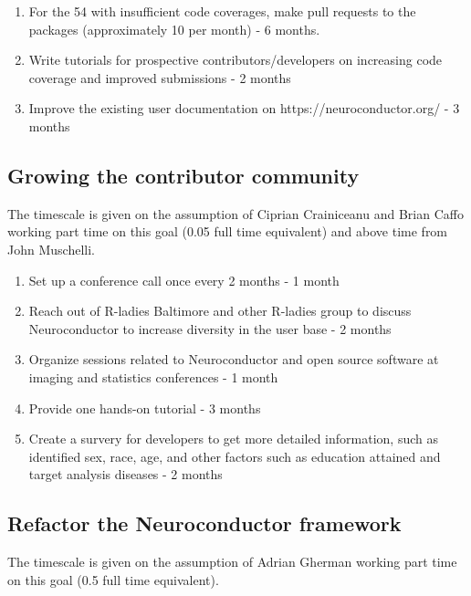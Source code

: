\documentclass[]{elsarticle} %
\providecommand{\tightlist}{%
  \setlength{\itemsep}{0pt}\setlength{\parskip}{0pt}}
\begin{document}
\begin{enumerate}
\def\labelenumi{\arabic{enumi}.}
\tightlist
\item
  For the 54 with insufficient code coverages, make pull requests to the packages (approximately 10 per month) - 6 months.\\
\item
  Write tutorials for prospective contributors/developers on increasing code coverage and improved submissions - 2 months
\item
  Improve the existing user documentation on https://neuroconductor.org/ - 3 months
\end{enumerate}

\hypertarget{growing-the-contributor-community-1}{%
\subsection{Growing the contributor community}\label{growing-the-contributor-community-1}}

The timescale is given on the assumption of Ciprian Crainiceanu and Brian Caffo working part time on this goal (0.05 full time equivalent) and above time from John Muschelli.

\begin{enumerate}
\def\labelenumi{\arabic{enumi}.}
\tightlist
\item
  Set up a conference call once every 2 months - 1 month
\item
  Reach out of R-ladies Baltimore and other R-ladies group to discuss Neuroconductor to increase diversity in the user base - 2 months
\item
  Organize sessions related to Neuroconductor and open source software at imaging and statistics conferences - 1 month
\item
  Provide one hands-on tutorial - 3 months
\item
  Create a survery for developers to get more detailed information, such as identified sex, race, age, and other factors such as education attained and target analysis diseases - 2 months
\end{enumerate}

\hypertarget{refactor-the-neuroconductor-framework-1}{%
\subsection{Refactor the Neuroconductor framework}\label{refactor-the-neuroconductor-framework-1}}

The timescale is given on the assumption of Adrian Gherman working part
time on this goal (0.5 full time equivalent).
\end{document}
